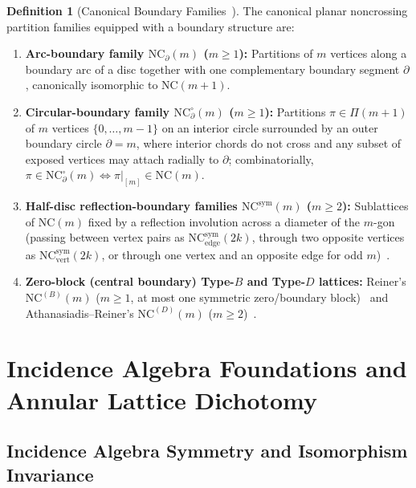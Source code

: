 \documentclass[11pt]{article}
\theoremstyle{definition}
\newtheorem{definition}[theorem]{Definition}
\newcommand{\NC}{\mathrm{NC}}
\newcommand{\NCB}{\mathrm{NC}^{(B)}}
\newcommand{\NCD}{\mathrm{NC}^{(D)}}
\newcommand{\NCsym}{\mathrm{NC}^{\mathrm{sym}}}
\begin{document}
\begin{definition}[Canonical Boundary Families~\cite{SU91,Rei97,AR04}]\label{def:boundary}
The canonical planar noncrossing partition families equipped with a boundary structure are:
\begin{enumerate}
  \item \textbf{Arc-boundary family $\NC_\partial(m)$ ($m \ge 1$):} Partitions of $m$ vertices along a boundary arc of a disc together with one complementary boundary segment $\partial$, canonically isomorphic to $\NC(m+1)$.
  \item \textbf{Circular-boundary family $\NC_\partial^\circ(m)$ ($m \ge 1$):} Partitions $\pi \in \Pi(m+1)$ of $m$ vertices $\{0,\dots,m-1\}$ on an interior circle surrounded by an outer boundary circle $\partial = m$, where interior chords do not cross and any subset of exposed vertices may attach radially to $\partial$; combinatorially, $\pi \in \NC_\partial^\circ(m) \iff \pi|_{[m]} \in \NC(m)$.
  \item \textbf{Half-disc reflection-boundary families $\NCsym(m)$ ($m \ge 2$):} Sublattices of $\NC(m)$ fixed by a reflection involution across a diameter of the $m$-gon (passing between vertex pairs as $\NCsym_{\mathrm{edge}}(2k)$, through two opposite vertices as $\NCsym_{\mathrm{vert}}(2k)$, or through one vertex and an opposite edge for odd $m$)~\cite{SU91,Sim00}.
  \item \textbf{Zero-block (central boundary) Type-$B$ and Type-$D$ lattices:} Reiner's $\NCB(m)$ ($m \ge 1$, at most one symmetric zero/boundary block)~\cite{Rei97} and Athanasiadis--Reiner's $\NCD(m)$ ($m \ge 2$)~\cite{AR04}.
\end{enumerate}
\end{definition}

\section{Incidence Algebra Foundations and Annular Lattice Dichotomy}

\subsection{Incidence Algebra Symmetry and Isomorphism Invariance}
\end{document}

